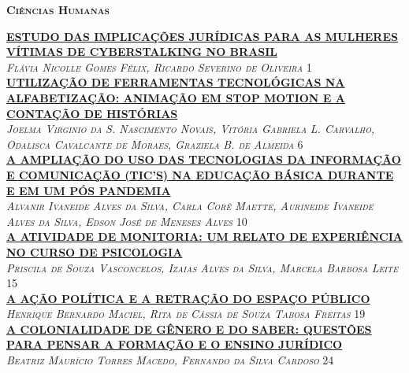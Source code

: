 
\vspace*{2cm} 
\noindent \textsc{\textbf{\LARGE Ciências Humanas}}\\ 
\vspace*{1cm} 

\noindent \textsc{\hyperlink{trabalhos/250109.pdf.1}{\textbf{  ESTUDO DAS IMPLICAÇÕES JURÍDICAS PARA AS MULHERES VÍTIMAS DE CYBERSTALKING NO BRASIL}}}\\ 
\noindent \textsc{\textit{Flávia Nicolle Gomes Félix, Ricardo Severino de Oliveira}} \hfill 1\\ 

\noindent \textsc{\hyperlink{trabalhos/249386.pdf.1}{\textbf{ UTILIZAÇÃO DE FERRAMENTAS TECNOLÓGICAS NA ALFABETIZAÇÃO: ANIMAÇÃO EM  STOP MOTION E A CONTAÇÃO DE HISTÓRIAS}}}\\ 
\noindent \textsc{\textit{Joelma Virginio da S. Nascimento Novais, Vitória Gabriela L. Carvalho, Odalisca Cavalcante de Moraes, Graziela B. de Almeida}} \hfill 6\\ 

\noindent \textsc{\hyperlink{trabalhos/251851.pdf.1}{\textbf{A AMPLIAÇÃO DO USO DAS TECNOLOGIAS DA INFORMAÇÃO E COMUNICAÇÃO (TIC’S) NA EDUCAÇÃO BÁSICA DURANTE E EM UM PÓS PANDEMIA}}}\\ 
\noindent \textsc{\textit{Alvanir Ivaneide Alves da Silva, Carla Corê Maette, Aurineide Ivaneide Alves da Silva, Edson José de Meneses Alves}} \hfill 10\\ 

\noindent \textsc{\hyperlink{trabalhos/251152.pdf.1}{\textbf{A ATIVIDADE DE MONITORIA: UM RELATO DE EXPERIÊNCIA NO CURSO DE PSICOLOGIA}}}\\ 
\noindent \textsc{\textit{Priscila de Souza Vasconcelos, Izaias Alves da Silva, Marcela Barbosa Leite}} \hfill 15\\ 

\noindent \textsc{\hyperlink{trabalhos/250279.pdf.1}{\textbf{A AÇÃO POLÍTICA E A RETRAÇÃO DO ESPAÇO PÚBLICO}}}\\ 
\noindent \textsc{\textit{Henrique Bernardo Maciel, Rita de Cássia de Souza Tabosa Freitas}} \hfill 19\\ 

\noindent \textsc{\hyperlink{trabalhos/250079.pdf.1}{\textbf{A COLONIALIDADE DE GÊNERO E DO SABER: QUESTÕES PARA PENSAR A FORMAÇÃO E O ENSINO JURÍDICO }}}\\ 
\noindent \textsc{\textit{Beatriz Maurício Torres Macedo, Fernando da Silva Cardoso}} \hfill 24\\ 


